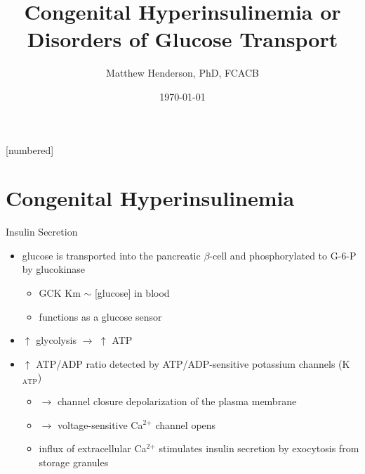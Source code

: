 \documentclass[presentation, smaller]{beamer}
\author{Matthew Henderson, PhD, FCACB}
\date{\today}
\title{Congenital Hyperinsulinemia or Disorders of Glucose Transport}
\institute[NSO]{Newborn Screening Ontario | The University of Ottawa}
\begin{document}
\maketitle


\vspace{220pt}
\beamertemplatenavigationsymbolsempty
{}[numbered]

\section{Congenital Hyperinsulinemia}
\label{sec:org4a2d3fa}
\begin{frame}[label={sec:org032c151}]{Insulin Secretion}
\begin{itemize}
\item glucose is transported into the pancreatic \(\beta\)-cell and phosphorylated to G-6-P by glucokinase
\begin{itemize}
\item GCK Km \(\sim\) [glucose] in  blood
\item functions as a glucose sensor
\end{itemize}
\item \(\uparrow\) glycolysis \(\to\) \(\uparrow\) ATP
\item \(\uparrow\) ATP/ADP ratio detected by ATP/ADP-sensitive potassium channels (K\(_{\text{ATP}}\))
\begin{itemize}
\item \(\to\) channel closure depolarization of the plasma membrane
\item \(\to\) voltage-sensitive Ca\(^{\text{2+}}\) channel opens
\item influx of extracellular Ca\(^{\text{2+}}\) stimulates insulin secretion by
exocytosis from storage granules
\end{itemize}
\end{itemize}
\end{frame}
\end{document}
